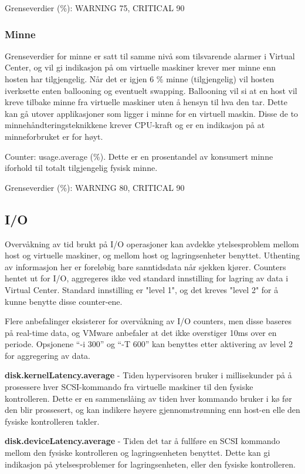 Grenseverdier (\%): WARNING 75, CRITICAL 90

\subsubsection*{Minne}
Grenseverdier for minne er satt til samme nivå som tilsvarende alarmer i Virtual Center, og vil gi indikasjon på om virtuelle maskiner krever mer minne enn hosten har tilgjengelig. Når det er igjen 6 \% minne (tilgjengelig) vil hosten iverksette enten ballooning og eventuelt swapping. Ballooning vil si at en host vil kreve tilbake minne fra virtuelle maskiner uten å hensyn til hva den tar. Dette kan gå utover applikasjoner som ligger i minne for en virtuell maskin. Disse de to minnehåndteringsteknikkene krever CPU-kraft og er en indikasjon på at minneforbruket er for høyt.

Counter: usage.average (\%). Dette er en prosentandel av konsumert minne iforhold til totalt tilgjengelig fysisk minne.

Grenseverdier (\%): WARNING 80, CRITICAL 90

\subsection*{I/O}

Overvåkning av tid brukt på I/O operasjoner kan avdekke ytelsesproblem mellom host og virtuelle maskiner, og mellom host og lagringsenheter benyttet. Uthenting av informasjon her er foreløbig bare sanntidsdata når sjekken kjører. Counters hentet ut for I/O, aggregeres ikke ved standard innstilling for lagring av data i Virtual Center. Standard innstilling er "level 1", og det kreves "level 2" for å kunne benytte disse counter-ene.

Flere anbefalinger eksisterer for overvåkning av I/O counters, men disse baseres på real-time data, og VMware anbefaler at det ikke overstiger 10ms over en periode. Opsjonene ``-i 300'' og ``-T 600'' kan benyttes etter aktivering av level 2 for aggregering av data.

{\bf disk.kernelLatency.average} - Tiden hypervisoren bruker i millisekunder på å prosessere hver SCSI-kommando fra virtuelle maskiner til den fysiske kontrolleren. Dette er en sammenslåing av tiden hver kommando bruker i kø før den blir prossesert, og kan indikere høyere gjennomstrømning enn host-en elle den fysiske kontrolleren takler. 
	
{\bf disk.deviceLatency.average} - Tiden det tar å fullføre en SCSI kommando mellom den fysiske kontrolleren og lagringsenheten benyttet. Dette kan gi indikasjon på ytelsesproblemer for lagringsenheten, eller den fysiske kontrolleren. 

